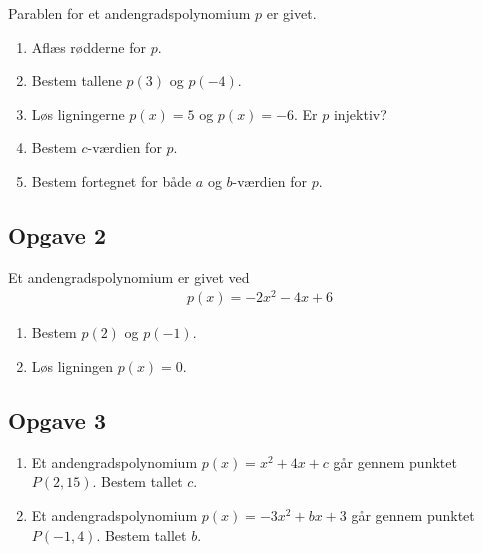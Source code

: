 Parablen for et andengradspolynomium $p$ er givet.
\begin{enumerate}[label=\roman*)]
	\item Aflæs rødderne for $p$.
	\item Bestem tallene $p(3)$ og $p(-4)$.
	\item Løs ligningerne $p(x) = 5$ og $p(x) = -6$. Er $p$ injektiv?
	\item Bestem $c$-værdien for $p$.
	\item Bestem fortegnet for både $a$ og $b$-værdien for $p$.
\end{enumerate}

\begin{center}
\end{center}

\subsection*{Opgave 2}
Et andengradspolynomium er givet ved
\begin{align*}
	p(x) = -2x^2 - 4x + 6 
\end{align*}
\begin{enumerate}[label=\roman*]
	\item Bestem $p(2)$ og $p(-1)$.
	\item Løs ligningen $p(x) = 0$. 
\end{enumerate}

\subsection*{Opgave 3}
\begin{enumerate}[label=\roman*)]
	\item Et andengradspolynomium $p(x) = x^2 + 4x + c$ går gennem punktet $P(2,15)$. Bestem tallet $c$.
	\item Et andengradspolynomium $p(x) = -3x^2 + bx + 3$ går gennem punktet $P(-1,4)$. Bestem tallet $b$.
\end{enumerate}

